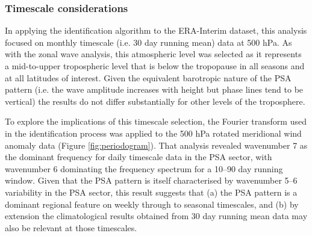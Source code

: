 \subsubsection{Timescale considerations}

In applying the identification algorithm to the ERA-Interim dataset, this analysis focused on monthly timescale (i.e. 30 day running mean) data at 500 hPa. As with the zonal wave analysis, this atmospheric level was selected as it represents a mid-to-upper tropospheric level that is below the tropopause in all seasons and at all latitudes of interest. Given the equivalent barotropic nature of the PSA pattern (i.e. the wave amplitude increases with height but phase lines tend to be vertical) the results do not differ substantially for other levels of the troposphere. 

To explore the implications of this timescale selection, the Fourier transform used in the identification process was applied to the 500 hPa rotated meridional wind anomaly data (Figure \ref{fig:periodogram}). That analysis revealed wavenumber 7 as the dominant frequency for daily timescale data in the PSA sector, with wavenumber 6 dominating the frequency spectrum for a 10--90 day running window. Given that the PSA pattern is itself characterised by wavenumber 5--6 variability in the PSA sector, this result suggests that (a) the PSA pattern is a dominant regional feature on weekly through to seasonal timescales, and (b) by extension the climatological results obtained from 30 day running mean data may also be relevant at those timescales.

